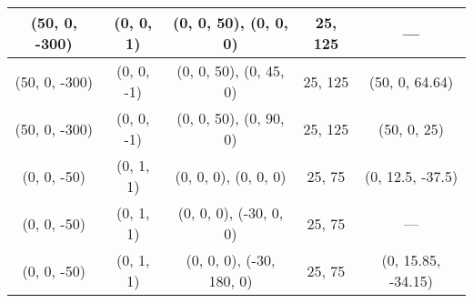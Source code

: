 \begin{table}[h]
\begin{center}
\begin{threeparttable}
\begin{tabular}{|c|c|c|c|c|}
				\hline
				(50, 0, -300) & (0, 0, 1) & (0, 0, 50), (0, 0, 0) & 25, 125 & --- \\
				\hline
				(50, 0, -300) & (0, 0, -1) & (0, 0, 50), (0, 45, 0) & 25, 125 & (50, 0, 64.64) \\
				\hline
				(50, 0, -300) & (0, 0, -1) & (0, 0, 50), (0, 90, 0) & 25, 125 &  (50, 0, 25)\\
				\hline
				(0, 0, -50) & (0, 1, 1) & (0, 0, 0), (0, 0, 0) & 25, 75 &  (0, 12.5, -37.5)\\
				\hline
				(0, 0, -50) & (0, 1, 1) & (0, 0, 0), (-30, 0, 0) & 25, 75 &  ---\\
				\hline
				(0, 0, -50) & (0, 1, 1) & (0, 0, 0), (-30, 180, 0) & 25, 75 & (0, 15.85, -34.15)\\
				\hline
			\end{tabular}
		\end{threeparttable}
	\end{center}
\end{table}

